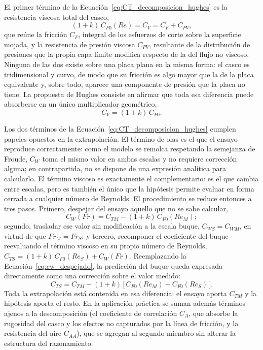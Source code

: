 El primer término de la Ecuación~\eqref{eq:CT_decomposicion_hughes} es la
resistencia viscosa total del casco,
%
\begin{equation}\label{eq:CV}
  (1+k)\,C_{F0}(Re) = C_V = C_F + C_{PV},
\end{equation}
%
que reúne la fricción $C_F$, integral de los esfuerzos de corte sobre la
superficie mojada, y la resistencia de presión viscosa $C_{PV}$, resultante de la
distribución de presiones que la propia capa límite modifica respecto de la del
flujo no viscoso. Ninguna de las dos existe sobre una placa plana en la misma
forma: el casco es tridimensional y curvo, de modo que su fricción es algo mayor
que la de la placa equivalente y, sobre todo, aparece una componente de presión
que la placa no tiene. La propuesta de Hughes consiste en afirmar que toda esa
diferencia puede absorberse en un único multiplicador geométrico,
%
\begin{equation}\label{eq:hughes}
    C_V = (1+k)\, C_{F0}.
\end{equation}

Los dos términos de la Ecuación~\eqref{eq:CT_decomposicion_hughes} cumplen
papeles opuestos en la extrapolación. El término de olas es el que el ensayo
reproduce correctamente: como el modelo se remolca respetando la semejanza de
Froude, $C_W$ toma el mismo valor en ambas escalas y no requiere corrección
alguna; en contrapartida, no se dispone de una expresión analítica para
calcularlo. El término viscoso es exactamente el complementario: es el que
cambia entre escalas, pero es también el único que la hipótesis permite evaluar
en forma cerrada a cualquier número de Reynolds. El procedimiento se reduce
entonces a tres pasos. Primero, despejar del ensayo aquello que no se sabe
calcular,
%
\begin{equation}\label{eq:cw_despejado}
    C_W(Fr) = C_{TM} - (1+k)\,C_{F0}(Re_M);
\end{equation}
%
segundo, trasladar ese valor sin modificación a la escala buque, $C_{WS} = C_{WM}$,
en virtud de que $Fr_M = Fr_S$; y tercero, recomponer el coeficiente del buque
reevaluando el término viscoso en su propio número de Reynolds,
$C_{TS} = (1+k)\,C_{F0}(Re_S) + C_W(Fr)$. Reemplazando la
Ecuación~\eqref{eq:cw_despejado}, la predicción del buque queda expresada
directamente como una corrección sobre el valor medido:
%
\begin{equation}\label{eq:extrapolacion_CTS}
    \boxed{\;C_{TS} = C_{TM} - (1+k)\,\bigl[\,C_{F0}(Re_M) - C_{F0}(Re_S)\,\bigr].\;}
\end{equation}
%
Toda la extrapolación está contenida en esa diferencia: el ensayo aporta
$C_{TM}$ y la hipótesis aporta el resto. En la aplicación práctica se suman
además términos ajenos a la descomposición (el coeficiente de correlación
$C_A$, que absorbe la rugosidad del casco y los efectos no capturados por la
línea de fricción, y la resistencia del aire $C_{AA}$), que se agregan al
segundo miembro sin alterar la estructura del razonamiento.

